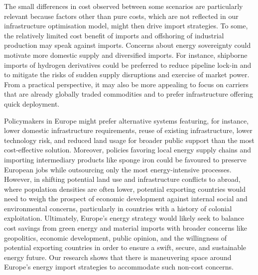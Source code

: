 The small differences in cost observed between some scenarios are particularly
relevant because factors other than pure costs, which are not reflected in our
infrastructure optimisation model, might then drive import strategies. To some,
the relatively limited cost benefit of imports and offshoring of industrial
production may speak against imports. Concerns about energy sovereignty could
motivate more domestic supply and diversified imports. For instance, shipborne
imports of hydrogen derivatives could be preferred to reduce pipeline lock-in
and to mitigate the risks of sudden supply disruptions and exercise of market
power. From a practical perspective, it may also be more appealing to focus on
carriers that are already globally traded commodities and to prefer
infrastructure offering quick deployment.

Policymakers in Europe might prefer alternative systems featuring, for instance,
lower domestic infrastructure requirements, reuse of existing infrastructure,
lower technology risk, and reduced land usage for broader public support than
the most cost-effective solution. Moreover, policies favoring local energy
supply chains and importing intermediary products like sponge iron could be
favoured to preserve European jobs while outsourcing only the most
energy-intensive processes. However, in shifting potential land use and
infrastructure conflicts to abroad, where population densities are often lower,
potential exporting countries would need to weigh the prospect of economic
development against internal social and environmental concerns, particularly in
countries with a history of colonial
exploitation.\cite{tunnGreenHydrogenTransitions2024} Ultimately, Europe's energy
strategy would likely seek to balance cost savings from green energy and
material imports with broader concerns like geopolitics, economic development,
public opinion, and the willingness of potential exporting countries in order to
ensure a swift, secure, and sustainable energy future. Our research shows that
there is maneuvering space around Europe's energy import strategies to
accommodate such non-cost concerns.
